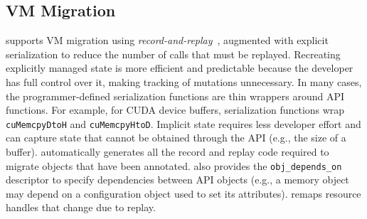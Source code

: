 

\subsection{VM Migration}
\label{s:migration}

\Model supports VM migration using \emph{record-and-replay}~\cite{migration_survey}, augmented with explicit serialization to reduce the number of calls that must be replayed.
Recreating explicitly managed state is more efficient and predictable because the developer has full control over it, making tracking of mutations unnecessary.
In many cases, the programmer-defined serialization functions are thin wrappers around API functions.
For example, for CUDA device buffers, serialization functions wrap \lstinline|cuMemcpyDtoH| and \lstinline|cuMemcpyHtoD|.
Implicit state requires less developer effort and can capture state that cannot be obtained through the API (e.g., the size of a buffer).
\Compiler automatically generates all the record and replay code required to migrate objects that have been annotated.
\Compiler also provides the \lstinline|obj_depends_on| descriptor to specify dependencies between API objects (e.g., a memory object may depend on a configuration object used to set its attributes).
\Model remaps resource handles that change due to replay.



